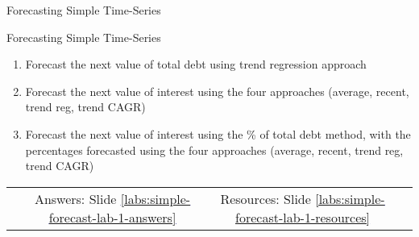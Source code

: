 \documentclass[handout, 11pt]{beamer}
\begin{document}
\begin{section}{Forecasting Simple Time-Series}
\begin{frame}
{\begin{block}{Forecasting Simple Time-Series}
\begin{enumerate}
\item Forecast the next value of total debt using trend regression approach
\item Forecast the next value of interest using the four approaches (average, recent, trend reg, trend CAGR)
\item Forecast the next value of interest using the \% of total debt method, with the percentages forecasted using the four approaches (average, recent, trend reg, trend CAGR)
\end{enumerate}
\vfill
\begin{tabular*}{\textwidth}{@{\extracolsep{\fill}}cccc}
\toprule
\hfill & Answers: Slide \textcolor{blue}{\underline{\ref{labs:simple-forecast-lab-1-answers}}} & Resources: Slide \textcolor{blue}{\underline{\ref{labs:simple-forecast-lab-1-resources}}} & \hfill\\

\end{tabular*}
\end{block}
}
\label{labs:simple-forecast-lab-1}
\end{frame}
\end{section}
\end{document}

